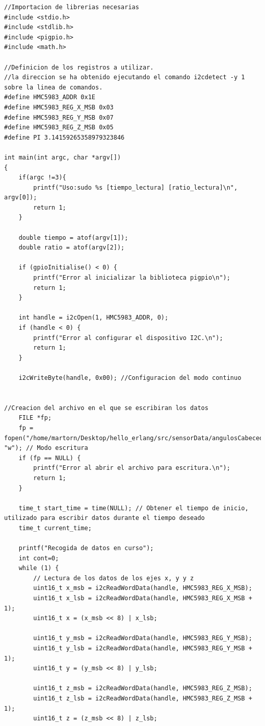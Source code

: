 \lstset{language=C, breaklines=true, basicstyle=\footnotesize}
\begin{lstlisting}[frame=single]
//Importacion de librerias necesarias
#include <stdio.h>
#include <stdlib.h>
#include <pigpio.h>
#include <math.h> 

//Definicion de los registros a utilizar.
//la direccion se ha obtenido ejecutando el comando i2cdetect -y 1 sobre la linea de comandos.
#define HMC5983_ADDR 0x1E 
#define HMC5983_REG_X_MSB 0x03
#define HMC5983_REG_Y_MSB 0x07
#define HMC5983_REG_Z_MSB 0x05
#define PI 3.14159265358979323846

int main(int argc, char *argv[])
{
    if(argc !=3){
        printf("Uso:sudo %s [tiempo_lectura] [ratio_lectura]\n", argv[0]);
        return 1;
    }
    
    double tiempo = atof(argv[1]);
    double ratio = atof(argv[2]);
    
    if (gpioInitialise() < 0) {
        printf("Error al inicializar la biblioteca pigpio\n");
        return 1;
    }

    int handle = i2cOpen(1, HMC5983_ADDR, 0);
    if (handle < 0) {
        printf("Error al configurar el dispositivo I2C.\n");
        return 1;
    }
   
    i2cWriteByte(handle, 0x00); //Configuracion del modo continuo
   

//Creacion del archivo en el que se escribiran los datos
    FILE *fp;
    fp = fopen("/home/martorn/Desktop/hello_erlang/src/sensorData/angulosCabeceo.txt", "w"); // Modo escritura
    if (fp == NULL) {
        printf("Error al abrir el archivo para escritura.\n");
        return 1;
    }

    time_t start_time = time(NULL); // Obtener el tiempo de inicio, utilizado para escribir datos durante el tiempo deseado
    time_t current_time;
    
    printf("Recogida de datos en curso");
    int cont=0;
    while (1) {
        // Lectura de los datos de los ejes x, y y z
        uint16_t x_msb = i2cReadWordData(handle, HMC5983_REG_X_MSB);
        uint16_t x_lsb = i2cReadWordData(handle, HMC5983_REG_X_MSB + 1);
        uint16_t x = (x_msb << 8) | x_lsb;

        uint16_t y_msb = i2cReadWordData(handle, HMC5983_REG_Y_MSB);
        uint16_t y_lsb = i2cReadWordData(handle, HMC5983_REG_Y_MSB + 1);
        uint16_t y = (y_msb << 8) | y_lsb;

        uint16_t z_msb = i2cReadWordData(handle, HMC5983_REG_Z_MSB);
        uint16_t z_lsb = i2cReadWordData(handle, HMC5983_REG_Z_MSB + 1);
        uint16_t z = (z_msb << 8) | z_lsb;


\end{lstlisting}
